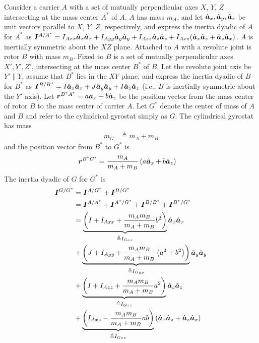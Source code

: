 Consider a carrier $A$ with a set of mutually perpendicular axes $X$, $Y$, $Z$
intersecting at the mass center $A^*$ of $A$. $A$ has mass $m_A$, and let
$\hat{\boldsymbol{a}}_{x}, \hat{\boldsymbol{a}}_{y}, \hat{\boldsymbol{a}}_{z}$ be unit vectors parallel to $X$, $Y$, $Z$,
respectively, and express the inertia dyadic of $A$ for $A^*$ as
$\boldsymbol{I}^{A/A^*} = I_{Axx}\hat{\boldsymbol{a}}_{x}\hat{\boldsymbol{a}}_{x} + I_{Ayy}\hat{\boldsymbol{a}}_{y}\hat{\boldsymbol{a}}_{y} +
I_{Azz}\hat{\boldsymbol{a}}_{z}\hat{\boldsymbol{a}}_{z} + I_{Axz}(\hat{\boldsymbol{a}}_{x}\hat{\boldsymbol{a}}_{z} + \hat{\boldsymbol{a}}_{z}\hat{\boldsymbol{a}}_{x})$.
$A$ is inertially symmetric about the $XZ$ plane. Attached to $A$ with a
revolute joint is rotor $B$ with mass $m_B$. Fixed to $B$ is a set of mutually
perpendicular axes $X', Y', Z'$, intersecting at the mass center $B^*$ of $B$.
Let the revolute joint axis be $Y'\parallel Y$, assume that $B^*$ lies in the
$XY$ plane, and express the inertia dyadic of $B$ for $B^*$ as $\boldsymbol{I}^{B/B^*}
= I\hat{\boldsymbol{a}}_{x}\hat{\boldsymbol{a}}_{x} + J\hat{\boldsymbol{a}}_{y}\hat{\boldsymbol{a}}_{y} + I\hat{\boldsymbol{a}}_{z}\hat{\boldsymbol{a}}_{z}$ (i.e., $B$
is inertially symmetric about the $Y'$ axis).  Let $\boldsymbol{r}^{B^*A^*} = a
\hat{\boldsymbol{a}}_{x} + b \hat{\boldsymbol{a}}_{z}$ be the position vector from the mass center of rotor
$B$ to the mass center of carrier $A$. Let $G^*$ denote the center of mass of
$A$ and $B$ and refer to the cylindrical gyrostat simply as $G$. The
cylindrical gyrostat has mass
\begin{align}
  m_G &\triangleq m_A + m_B
\end{align}
and the position vector from $B^*$ to $G^*$ is
\begin{align}
  \boldsymbol{r}^{B^*G^*} &= \frac{m_A}{m_A + m_B}\left(a \hat{\boldsymbol{a}}_{x} + b \hat{\boldsymbol{a}}_{z}\right)
\end{align}
The inertia dyadic of $G$ for $G^*$ is
\begin{align}
  \bs{I}^{G/G^*} &= \bs{I}^{A/G^*} + \bs{I}^{B/G^*} \notag \\
                 &= \bs{I}^{A/A^*} + \bs{I}^{A^*/G^*} + \bs{I}^{B/B^*} +
                 \bs{I}^{B^*/G^*} \notag \\
%
                 &= \underbrace{\left(I + I_{Axx} + \frac{m_A m_B}{m_A + m_B}
               b^2 \right)}_{\triangleq I_{Gxx}}
                 \uv{a}{x}\uv{a}{x} \notag \\
%
                 &+ \underbrace{\left(J + I_{Ayy} + \frac{m_A m_B}{m_A + m_B} \left(a^2 +
               b^2\right)\right)}_{\triangleq I_{Gyy}} \uv{a}{y}\uv{a}{y} \notag \\
%
                 &+ \underbrace{\left(I + I_{Azz} + \frac{m_A m_B}{m_A + m_B}
               a^2 \right)}_{\triangleq I_{Gzz}}
                 \uv{a}{z}\uv{a}{z} \notag \\
%
                 &+ \underbrace{\left(I_{Axz} - \frac{m_A m_B}{m_A + m_B} a b
               \right)}_{\triangleq I_{Gxz}}
               \left(\uv{a}{x}\uv{a}{z} + \uv{a}{z}\uv{a}{x}\right)
\end{align}
